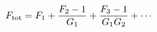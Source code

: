 \documentclass[preview]{standalone}
\begin{document}
\begin{align*}
\special{dvisvgm:raw <g id='unique000'>}F_{\rm tot} = F_1 + \frac{F_2-1}{G_1}+ \frac{F_3-1}{G_1 G_2} + \cdots\special{dvisvgm:raw </g>}
\end{align*}
\end{document}
